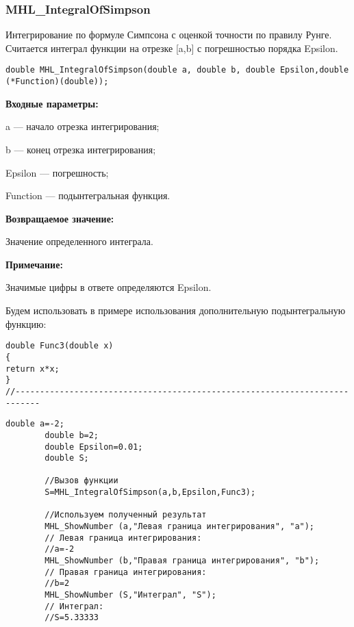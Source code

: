 \documentclass[a4paper,12pt]{article}
\begin{document}
\subsubsection{MHL\_IntegralOfSimpson}\label{MHL_IntegralOfSimpson}

Интегрирование по формуле Симпсона с оценкой точности по правилу Рунге. Считается интеграл функции на отрезке [a,b] с погрешностью порядка Epsilon.


\begin{lstlisting}[label=code_syntax_MHL_IntegralOfSimpson,caption=Синтаксис]
double MHL_IntegralOfSimpson(double a, double b, double Epsilon,double (*Function)(double));
\end{lstlisting}

\textbf{Входные параметры:}

 a --- начало отрезка интегрирования;
 
 b --- конец отрезка интегрирования;
 
 Epsilon --- погрешность;
 
 Function --- подынтегральная функция.

\textbf{Возвращаемое значение:}
 
 Значение определенного интеграла.
 
 \textbf{Примечание:}
 
 Значимые цифры в ответе определяются Epsilon.

Будем использовать в примере использования дополнительную подынтегральную функцию:

\begin{lstlisting}[caption=Дополнительная функция]
double Func3(double x)
{
return x*x;
}
//---------------------------------------------------------------------------
\end{lstlisting}


\begin{lstlisting}[label=code_use_MHL_IntegralOfSimpson,caption=Пример использования]
        double a=-2;
        double b=2;
        double Epsilon=0.01;
        double S;

        //Вызов функции
        S=MHL_IntegralOfSimpson(a,b,Epsilon,Func3);

        //Используем полученный результат
        MHL_ShowNumber (a,"Левая граница интегрирования", "a");
        // Левая граница интегрирования:
        //a=-2
        MHL_ShowNumber (b,"Правая граница интегрирования", "b");
        // Правая граница интегрирования:
        //b=2
        MHL_ShowNumber (S,"Интеграл", "S");
        // Интеграл:
        //S=5.33333
\end{lstlisting}
\end{document}
